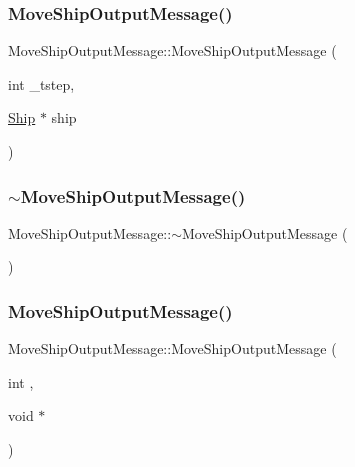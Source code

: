 \subsubsection{\texorpdfstring{MoveShipOutputMessage()}{MoveShipOutputMessage()}\hspace{0.1cm}{\footnotesize\ttfamily [1/2]}}
{\footnotesize\ttfamily Move\+Ship\+Output\+Message\+::\+Move\+Ship\+Output\+Message (\begin{DoxyParamCaption}\item[{int}]{\+\_\+tstep,  }\item[{\mbox{\hyperlink{class_ship}{Ship}} $\ast$}]{ship }\end{DoxyParamCaption})}

\mbox{\label{class_move_ship_output_message_a29c3365753e26ce4d6cd548845635697}} 
\subsubsection{\texorpdfstring{$\sim$MoveShipOutputMessage()}{~MoveShipOutputMessage()}}
{\footnotesize\ttfamily Move\+Ship\+Output\+Message\+::$\sim$\+Move\+Ship\+Output\+Message (\begin{DoxyParamCaption}{ }\end{DoxyParamCaption})\hspace{0.3cm}{\ttfamily [inline]}}

\mbox{\label{class_move_ship_output_message_a72ebd45cc5b149d89081e97888c76165}} 
\subsubsection{\texorpdfstring{MoveShipOutputMessage()}{MoveShipOutputMessage()}\hspace{0.1cm}{\footnotesize\ttfamily [2/2]}}
{\footnotesize\ttfamily Move\+Ship\+Output\+Message\+::\+Move\+Ship\+Output\+Message (\begin{DoxyParamCaption}\item[{int}]{,  }\item[{void $\ast$}]{ }\end{DoxyParamCaption})\hspace{0.3cm}{\ttfamily [inline]}}



